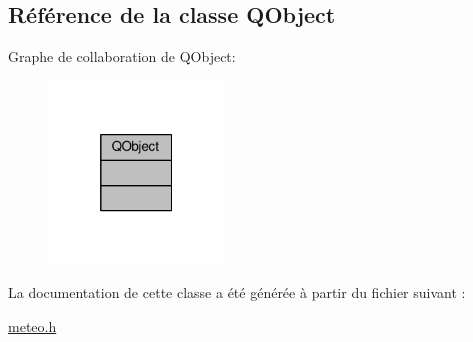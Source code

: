 \hypertarget{class_q_object}{}\subsection{Référence de la classe Q\+Object}
\label{class_q_object}


Graphe de collaboration de Q\+Object\+:
\nopagebreak
\begin{figure}[H]
\begin{center}
\leavevmode
\includegraphics[width=133pt]{class_q_object__coll__graph}
\end{center}
\end{figure}


La documentation de cette classe a été générée à partir du fichier suivant \+:\begin{DoxyCompactItemize}
\item 
\hyperlink{meteo_8h}{meteo.\+h}\end{DoxyCompactItemize}
